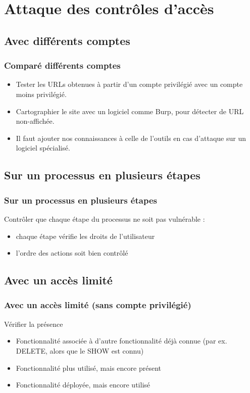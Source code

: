 \documentclass{beamer}
\begin{document}
\section{Attaque des contrôles d'accès}
\subsection{Avec différents comptes}

\begin{frame}
  \frametitle{Comparé différents comptes}
  \begin{itemize}
    \item Tester les URLs obtenues à partir d'un compte privilégié avec un compte moins privilégié.
    \item Cartographier le site avec un logiciel comme Burp, pour détecter de URL non-affichée.
    \item Il faut ajouter nos connaissances à celle de l'outils en cas d'attaque sur un logiciel spécialisé.
  \end{itemize}
\end{frame}

\subsection{Sur un processus en plusieurs étapes}

\begin{frame}
  \frametitle{Sur un processus en plusieurs étapes}
  Contrôler que chaque étape du processus ne soit pas vulnérable : 
  \vspace{2em}
  \begin{itemize}
    \item chaque étape vérifie les droits de l'utilisateur
    \item l'ordre des actions soit bien contrôlé
  \end{itemize}
\end{frame}

\subsection{Avec un accès limité}
\begin{frame}
  \frametitle{Avec un accès limité (sans compte privilégié)}
  Vérifier la présence
  \begin{itemize}
    \item Fonctionnalité associée à d'autre fonctionnalité déjà connue (par ex. DELETE, alors que le SHOW est connu)
    \item Fonctionnalité plus utilisé, mais encore présent
    \item Fonctionnalité déployée, mais encore utilisé
  \end{itemize}
\end{frame}
\end{document}
